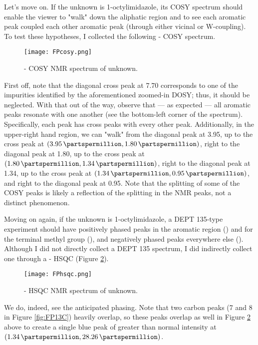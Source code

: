 \documentclass[titlepage]{article}
\begin{document}
Let's move on. If the unknown is 1-octylimidazole, its COSY spectrum should enable the viewer to "walk" down the aliphatic region and to see each aromatic peak coupled each other aromatic peak (through either vicinal or W-coupling). To test these hypotheses, I collected the following - COSY spectrum.
\begin{figure}[H]
    \centering
    \texttt{[image: FPcosy.png]}
    \caption{- COSY NMR spectrum of unknown.}
    \label{fig:FPcosy}
\end{figure}
First off, note that the diagonal cross peak at \SI{7.70}{\partspermillion} corresponds to one of the impurities identified by the aforementioned zoomed-in DOSY; thus, it should be neglected. With that out of the way, observe that --- as expected --- all aromatic peaks resonate with one another (see the bottom-left corner of the spectrum). Specifically, each peak has cross peaks with every other peak. Additionally, in the upper-right hand region, we can "walk" from the diagonal peak at \SI{3.95}{\partspermillion}, up to the cross peak at $(\SI{3.95}{\partspermillion},\SI{1.80}{\partspermillion})$, right to the diagonal peak at \SI{1.80}{\partspermillion}, up to the cross peak at $(\SI{1.80}{\partspermillion},\SI{1.34}{\partspermillion})$, right to the diagonal peak at \SI{1.34}{\partspermillion}, up to the cross peak at $(\SI{1.34}{\partspermillion},\SI{0.95}{\partspermillion})$, and right to the diagonal peak at \SI{0.95}{\partspermillion}. Note that the splitting of some of the COSY peaks is likely a reflection of the splitting in the  NMR peaks, not a distinct phenomenon.
\newpage


Moving on again, if the unknown is 1-octylimidazole, a DEPT 135-type experiment should have positively phased peaks in the aromatic region () and for the terminal methyl group (), and negatively phased peaks everywhere else (). Although I did not directly collect a DEPT 135 spectrum, I did indirectly collect one through a - HSQC (Figure \ref{fig:FPhsqc}).
\begin{figure}[H]
    \centering
    \texttt{[image: FPhsqc.png]}
    \caption{- HSQC NMR spectrum of unknown.}
    \label{fig:FPhsqc}
\end{figure}
We do, indeed, see the anticipated phasing. Note that two carbon peaks (7 and 8 in Figure \ref{fig:FP13C}) heavily overlap, so these peaks overlap as well in Figure \ref{fig:FPhsqc} above to create a single blue peak of greater than normal intensity at $(\SI{1.34}{\partspermillion},\SI{28.26}{\partspermillion})$.
\newpage
\end{document}
